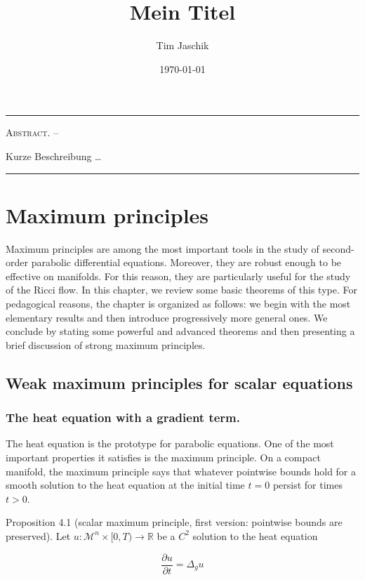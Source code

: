 \documentclass[10pt, letterpaper]{article}
\title{Mein Titel}
\author{Tim Jaschik}
\date{\today}
\renewenvironment{abstract}
  {
    \begin{adjustwidth}{1.5cm}{1.5cm}
    \small
    \textsc{Abstract. –}%
  }
  {
    \end{adjustwidth}
  }
\begin{document}
\maketitle
\rule{\textwidth}{0.5pt}
\begin{abstract}
Kurze Beschreibung …
\end{abstract}
\rule{\textwidth}{0.5pt}
\vspace{0.5cm}

\tableofcontents

\pagebreak

\section{Maximum principles}



Maximum principles are among the most important tools in the study of second-order parabolic differential equations. Moreover, they are robust enough to be effective on manifolds. For this reason, they are particularly useful for the study of the Ricci flow. In this chapter, we review some basic theorems of this type. For pedagogical reasons, the chapter is organized as follows: we begin with the most elementary results and then introduce progressively more general ones. We conclude by stating some powerful and advanced theorems and then presenting a brief discussion of strong maximum principles.


\subsection{Weak maximum principles for scalar equations}


\subsubsection{The heat equation with a gradient term. }

The heat equation is the prototype for parabolic equations. One of the most important properties it satisfies is the maximum principle. On a compact manifold, the maximum principle says that whatever pointwise bounds hold for a smooth solution to the heat equation at the initial time $t=0$ persist for times $t>0$.

Proposition 4.1 (scalar maximum principle, first version: pointwise bounds are preserved). Let $u: \mathcal{M}^n \times[0, T) \rightarrow \mathbb{R}$ be a $C^2$ solution to the heat equation

$$
\frac{\partial u}{\partial t}=\Delta_g u
$$
\end{document}
